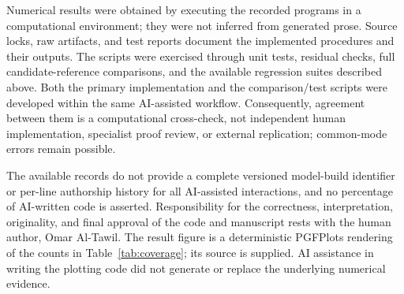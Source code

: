 Numerical results were obtained by executing the recorded programs in a computational environment; they were not inferred from generated prose. Source locks, raw artifacts, and test reports document the implemented procedures and their outputs. The scripts were exercised through unit tests, residual checks, full candidate-reference comparisons, and the available regression suites described above. Both the primary implementation and the comparison/test scripts were developed within the same AI-assisted workflow. Consequently, agreement between them is a computational cross-check, not independent human implementation, specialist proof review, or external replication; common-mode errors remain possible.

The available records do not provide a complete versioned model-build identifier or per-line authorship history for all AI-assisted interactions, and no percentage of AI-written code is asserted. Responsibility for the correctness, interpretation, originality, and final approval of the code and manuscript rests with the human author, Omar Al-Tawil. The result figure is a deterministic PGFPlots rendering of the counts in Table~\ref{tab:coverage}; its source is supplied. AI assistance in writing the plotting code did not generate or replace the underlying numerical evidence.

